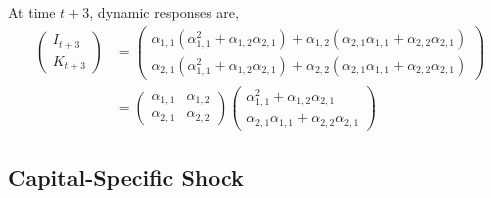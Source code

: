 \documentclass{article}
\begin{document}
At time $t + 3$, dynamic responses are,
\begin{equation}\label{eq:I_responses_three}
\begin{aligned}
\begin{pmatrix}
I_{t+3} \\
K_{t+3}
\end{pmatrix} &= \begin{pmatrix}
\alpha_{1,1}(\alpha_{1,1}^2 + \alpha_{1,2}\alpha_{2,1}) + \alpha_{1,2}(\alpha_{2,1}\alpha_{1,1} + \alpha_{2,2}\alpha_{2,1})  \\
\alpha_{2,1}(\alpha_{1,1}^2 + \alpha_{1,2}\alpha_{2,1}) + \alpha_{2,2}(\alpha_{2,1}\alpha_{1,1} + \alpha_{2,2}\alpha_{2,1})
\end{pmatrix} \\
&= \begin{pmatrix}
\alpha_{1,1} & \alpha_{1,2} \\
\alpha_{2,1} & \alpha_{2,2}
\end{pmatrix}\begin{pmatrix}
\alpha_{1,1}^2 + \alpha_{1,2}\alpha_{2,1} \\
\alpha_{2,1}\alpha_{1,1} + \alpha_{2,2}\alpha_{2,1}
\end{pmatrix} 
\end{aligned}
\end{equation} 

\subsection{Capital-Specific Shock}
\end{document}
